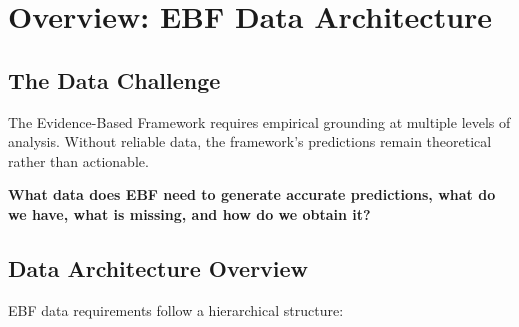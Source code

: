 \section{Overview: EBF Data Architecture}
\label{sec:dr-overview}

\subsection{The Data Challenge}

The Evidence-Based Framework requires empirical grounding at multiple levels of analysis. Without reliable data, the framework's predictions remain theoretical rather than actionable.

\begin{tcolorbox}[colback=red!5!white, colframe=red!75!black,
    title=The Fundamental Question]
\textbf{What data does EBF need to generate accurate predictions, what do we have, what is missing, and how do we obtain it?}
\end{tcolorbox}

\subsection{Data Architecture Overview}

EBF data requirements follow a hierarchical structure:

